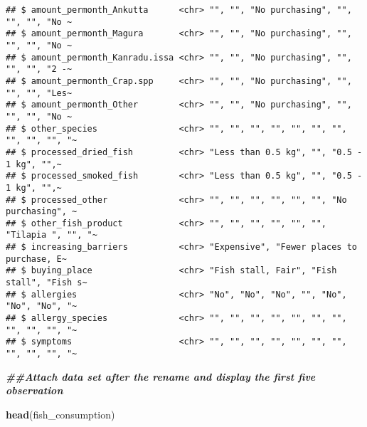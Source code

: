 \documentclass[
]{article}
\newenvironment{Shaded}{\begin{snugshade}}{\end{snugshade}}
\newcommand{\DocumentationTok}[1]{\textcolor[rgb]{0.56,0.35,0.01}{\textbf{\textit{#1}}}}
\newcommand{\FunctionTok}[1]{\textcolor[rgb]{0.13,0.29,0.53}{\textbf{#1}}}
\newcommand{\NormalTok}[1]{#1}
\begin{document}
\begin{verbatim}
## $ amount_permonth_Ankutta      <chr> "", "", "No purchasing", "", "", "", "No ~
## $ amount_permonth_Magura       <chr> "", "", "No purchasing", "", "", "", "No ~
## $ amount_permonth_Kanradu.issa <chr> "", "", "No purchasing", "", "", "", "2 -~
## $ amount_permonth_Crap.spp     <chr> "", "", "No purchasing", "", "", "", "Les~
## $ amount_permonth_Other        <chr> "", "", "No purchasing", "", "", "", "No ~
## $ other_species                <chr> "", "", "", "", "", "", "", "", "", "", "~
## $ processed_dried_fish         <chr> "Less than 0.5 kg", "", "0.5 - 1 kg", "",~
## $ processed_smoked_fish        <chr> "Less than 0.5 kg", "", "0.5 - 1 kg", "",~
## $ processed_other              <chr> "", "", "", "", "", "", "No purchasing", ~
## $ other_fish_product           <chr> "", "", "", "", "", "", "Tilapia ", "", "~
## $ increasing_barriers          <chr> "Expensive", "Fewer places to purchase, E~
## $ buying_place                 <chr> "Fish stall, Fair", "Fish stall", "Fish s~
## $ allergies                    <chr> "No", "No", "No", "", "No", "No", "No", "~
## $ allergy_species              <chr> "", "", "", "", "", "", "", "", "", "", "~
## $ symptoms                     <chr> "", "", "", "", "", "", "", "", "", "", "~
\end{verbatim}

\begin{Shaded}
\begin{Highlighting}[]
\DocumentationTok{\#\#Attach data set after the rename and display the first five observation}

\FunctionTok{head}\NormalTok{(fish\_consumption)}
\end{Highlighting}
\end{Shaded}
\end{document}
